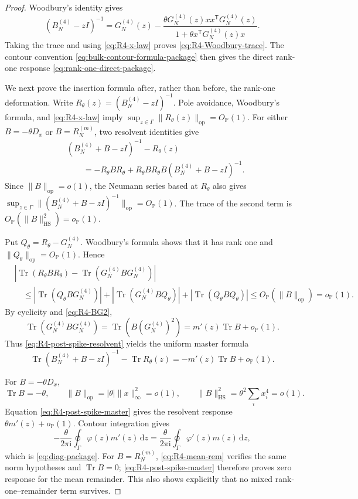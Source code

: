 \documentclass[10pt,a4paper]{amsart}
\newcommand{\Tr}{\operatorname{Tr}}
\newcommand{\ii}{\mathrm i}
\newcommand{\dd}{\mathrm d}
\newcommand{\op}{\mathrm{op}}
\newcommand{\HS}{\mathrm{HS}}
\newcommand{\norm}[1]{\lVert #1\rVert}
\begin{document}
\begin{proof}
Woodbury's identity gives
\[
 (B_N^{(4)}-zI)^{-1}
 =G_N^{(4)}(z)
 -\frac{\theta G_N^{(4)}(z)xx^{\mathsf T}G_N^{(4)}(z)}
 {1+\theta x^{\mathsf T}G_N^{(4)}(z)x}.
\]
Taking the trace and using \eqref{eq:R4-x-law} proves
\eqref{eq:R4-Woodbury-trace}.  The contour convention
\eqref{eq:bulk-contour-formula-package} then gives the direct rank-one
response \eqref{eq:rank-one-direct-package}.

We next prove the insertion formula after, rather than before, the rank-one
deformation.  Write
\(R_\theta(z)=(B_N^{(4)}-zI)^{-1}\).  Pole avoidance, Woodbury's formula,
and \eqref{eq:R4-x-law} imply
\(\sup_{z\in\Gamma}\norm{R_\theta(z)}_{\op}=O_{\mathbb P}(1)\).
For either \(B=-\theta D_x\) or \(B=R_N^{(m)}\), two resolvent identities
give
\begin{align}
 &(B_N^{(4)}+B-zI)^{-1}-R_\theta(z)\nonumber\\
 &\qquad=-R_\theta BR_\theta
 +R_\theta BR_\theta B(B_N^{(4)}+B-zI)^{-1}.
 \label{eq:R4-post-spike-resolvent}
\end{align}
Since \(\norm B_{\op}=o(1)\), the Neumann series based at \(R_\theta\)
also gives
\(\sup_{z\in\Gamma}\norm{(B_N^{(4)}+B-zI)^{-1}}_{\op}
=O_{\mathbb P}(1)\).
The trace of the second term is
\(O_{\mathbb P}(\norm B_{\HS}^2)=o_{\mathbb P}(1)\).

Put \(Q_\theta=R_\theta-G_N^{(4)}\).  Woodbury's formula shows that it has
rank one and \(\norm{Q_\theta}_{\op}=O_{\mathbb P}(1)\).  Hence
\begin{align*}
 &\left|\Tr(R_\theta BR_\theta)
          -\Tr(G_N^{(4)}BG_N^{(4)})\right|\\
 &\quad\le
 |\Tr(Q_\theta BG_N^{(4)})|
 +|\Tr(G_N^{(4)}BQ_\theta)|
 +|\Tr(Q_\theta BQ_\theta)|
 \le O_{\mathbb P}(\norm B_{\op})=o_{\mathbb P}(1).
\end{align*}
By cyclicity and \eqref{eq:R4-BG2},
\[
 \Tr(G_N^{(4)}BG_N^{(4)})
 =\Tr(B(G_N^{(4)})^2)
 =m'(z)\Tr B+o_{\mathbb P}(1).
\]
Thus \eqref{eq:R4-post-spike-resolvent} yields the uniform master formula
\begin{equation}\label{eq:R4-post-spike-master}
 \Tr(B_N^{(4)}+B-zI)^{-1}-\Tr R_\theta(z)
 =-m'(z)\Tr B+o_{\mathbb P}(1).
\end{equation}

For \(B=-\theta D_x\),
\[
 \Tr B=-\theta,\qquad
 \norm B_{\op}=|\theta|\norm{x}_\infty^2=o(1),\qquad
 \norm B_{\HS}^2=\theta^2\sum_i x_i^4=o(1).
\]
Equation \eqref{eq:R4-post-spike-master} gives the resolvent response
\(\theta m'(z)+o_{\mathbb P}(1)\).  Contour integration gives
\[
 -\frac{\theta}{2\pi\ii}\oint_\Gamma\varphi(z)m'(z)\,\dd z
 =\frac{\theta}{2\pi\ii}\oint_\Gamma\varphi'(z)m(z)\,\dd z,
\]
which is \eqref{eq:diag-package}.  For \(B=R_N^{(m)}\),
\eqref{eq:R4-mean-rem} verifies the same norm hypotheses and
\(\Tr B=0\); \eqref{eq:R4-post-spike-master} therefore proves zero response
for the mean remainder.  This also shows explicitly that no mixed
rank-one--remainder term survives.
\end{proof}
\end{document}
